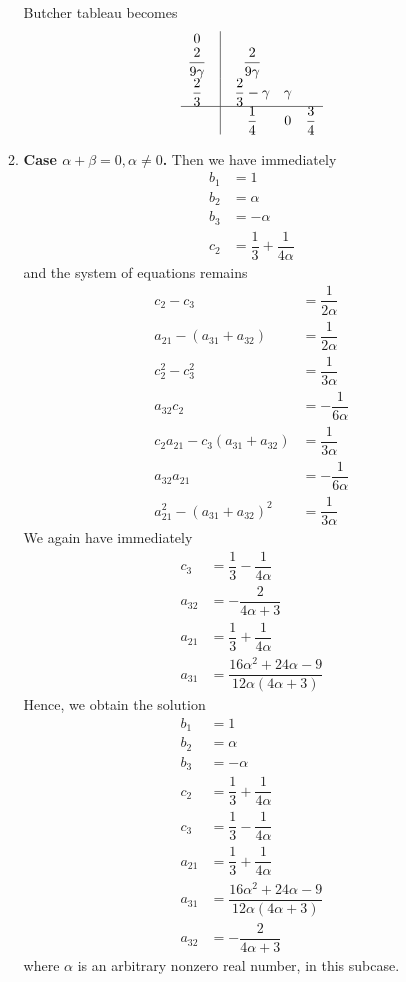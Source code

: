\documentclass[a4paper,oneside]{book}
\numberwithin{equation}{chapter}
\begin{document}
\begin{enumerate}
\begin{enumerate}
Butcher tableau becomes
\begin{align}
\begin{array}{*{20}{c}}
0&\vline& {}&{}&{}\\
{\dfrac{2}{{9\gamma }}}&\vline& {\dfrac{2}{{9\gamma }}}&{}&{}\\
{\dfrac{2}{3}}&\vline& {\dfrac{2}{3} - \gamma }&\gamma &{}\\
\hline
{}&\vline& {\dfrac{1}{4}}&0&{\dfrac{3}{4}}
\end{array}
\end{align}
\item \textbf{Case $\alpha + \beta =0,\alpha \ne 0$.} Then we have immediately
\begin{align}
{b_1} &= 1\\
{b_2} &= \alpha \\
{b_3} &=  - \alpha \\
{c_2} &= \dfrac{1}{3} + \dfrac{1}{{4\alpha }}
\end{align}
and the system of equations remains
\begin{align}
{c_2} - {c_3} &= \dfrac{1}{{2\alpha }}\\
{a_{21}} - \left( {{a_{31}} + {a_{32}}} \right) &= \dfrac{1}{{2\alpha }}\\
c_2^2 - c_3^2 &= \dfrac{1}{{3\alpha }}\\
{a_{32}}{c_2} &=  - \dfrac{1}{{6\alpha }}\\
{c_2}{a_{21}} - {c_3}\left( {{a_{31}} + {a_{32}}} \right) &= \dfrac{1}{{3\alpha }}\\
{a_{32}}{a_{21}}& =  - \dfrac{1}{{6\alpha }}\\
a_{21}^2 - {\left( {{a_{31}} + {a_{32}}} \right)^2} &= \dfrac{1}{{3\alpha }}
\end{align}
We again have immediately
\begin{align}
{c_3} &= \dfrac{1}{3} - \dfrac{1}{{4\alpha }}\\
{a_{32}} &=  - \dfrac{2}{{4\alpha  + 3}}\\
{a_{21}} &= \dfrac{1}{3} + \dfrac{1}{{4\alpha }}\\
{a_{31}} &= \dfrac{{16{\alpha ^2} + 24\alpha  - 9}}{{12\alpha \left( {4\alpha  + 3} \right)}}
\end{align}
Hence, we obtain the solution
\begin{align}
{b_1} &= 1\\
{b_2} &= \alpha \\
{b_3} &=  - \alpha \\
{c_2}& = \dfrac{1}{3} + \dfrac{1}{{4\alpha }}\\
{c_3} &= \dfrac{1}{3} - \dfrac{1}{{4\alpha }}\\
{a_{21}} &= \dfrac{1}{3} + \dfrac{1}{{4\alpha }}\\
{a_{31}} &= \dfrac{{16{\alpha ^2} + 24\alpha  - 9}}{{12\alpha \left( {4\alpha  + 3} \right)}}\\
{a_{32}} &=  - \dfrac{2}{{4\alpha  + 3}}
\end{align}
where $\alpha$ is an arbitrary nonzero real number, in this subcase.


\end{enumerate}
\end{enumerate}
\end{document}
